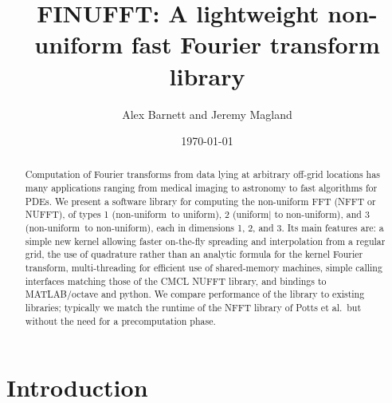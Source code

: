 \documentclass[10pt]{article}
\newcommand{\NU}{{non-uniform}}
\newcommand{\U}{{uniform}}
\begin{document}
\title{FINUFFT: A lightweight non-uniform fast Fourier transform library}
\author{Alex Barnett and Jeremy Magland}
\date{\today}
\maketitle
\begin{abstract}
  Computation of Fourier transforms from data lying at arbitrary
  off-grid locations has many applications ranging from medical
  imaging to astronomy to fast algorithms for PDEs.  We present a
  software library for computing the non-uniform FFT (NFFT or NUFFT),
  of types 1 (\NU\ to \U), 2 (\U| to \NU), and
  3 (\NU\ to \NU), each in dimensions 1, 2, and 3.  Its
  main features are: a simple new kernel allowing faster on-the-fly
  spreading and interpolation from a regular grid, the use of
  quadrature rather than an analytic formula for the kernel Fourier
  transform, multi-threading for efficient use of shared-memory
  machines, simple calling interfaces matching those of the CMCL
  NUFFT library, and bindings to MATLAB/octave and python.  We
  compare performance of the library to existing libraries; typically
  we match the runtime of the NFFT library of Potts et al.\ but
  without the need for a precomputation phase.
\end{abstract}




\section{Introduction}
\end{document}
